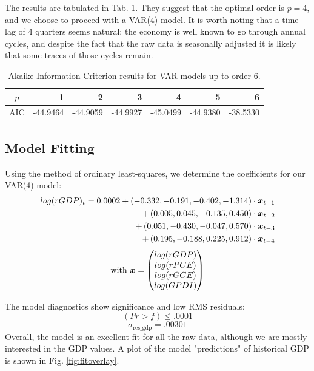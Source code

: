     The results are tabulated in Tab. \ref{tab:aicresults}.  They suggest that
    the optimal order is $p = 4$, and we choose to proceed with a VAR(4) model.
    It is worth noting that a time lag of 4 quarters seems natural: the economy
    is well known to go through annual cycles, and despite the fact that the raw
    data is seasonally adjusted it is likely that some traces of those cycles remain.
    \begin{table}[h]
    \begin{center}
    \begin{tabular}{|c|r|r|r|r|r|r|}
        \hline $p$ & 1 & 2 & 3 & \cellcolor{lightgray}\color{blue}4 & 5 & 6 \\
        \hline AIC & -44.9464 & -44.9059 & -44.9927 & \cellcolor{lightgray}\color{blue}-45.0499 & -44.9380 & -38.5330 \\
        \hline
    \end{tabular}
    \end{center}
    \caption{Akaike Information Criterion results for VAR models up to order 6.}
    \label{tab:aicresults}
    \end{table}

\subsection{Model Fitting} 

    Using the method of ordinary least-squares, we determine the coefficients
    for our VAR(4) model:    
    \begin{align*}
        log(rGDP)_t =  0.0002 
        + \left( -0.332, -0.191, -0.402, -1.314 \right) \cdot \boldsymbol{x}_{t-1} \\
        + \left(  0.005,  0.045, -0.135,  0.450 \right) \cdot \boldsymbol{x}_{t-2} \\
        + \left(  0.051, -0.430, -0.047,  0.570 \right) \cdot \boldsymbol{x}_{t-3} \\
        + \left(  0.195, -0.188,  0.225,  0.912 \right) \cdot \boldsymbol{x}_{t-4}
    \end{align*}
    \[ \text{with } \boldsymbol{x} = \begin{pmatrix} log(rGDP) \\ log(rPCE) \\ log(rGCE) \\ log(GPDI) \end{pmatrix} \]

    The model diagnostics show significance and low RMS residuals: 
        \[ (Pr>f) \le .0001 \]
        \[ \sigma_\text{res\_gdp} = .00301 \]  
    Overall, the model is an excellent fit for all the raw data, although we are
    mostly interested in the GDP values.
    A plot of the model "predictions" of historical GDP is shown in Fig. \ref{fig:fitoverlay}.
        
